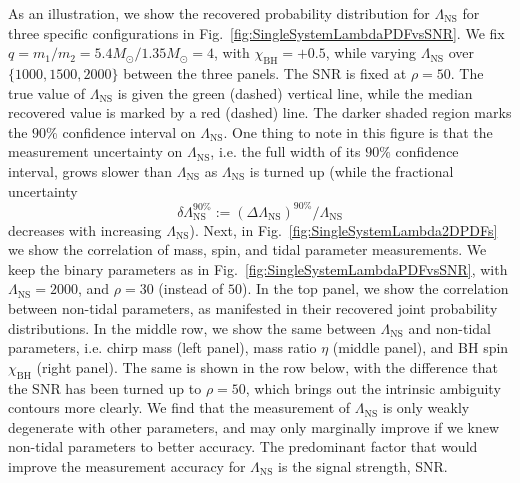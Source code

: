 \documentclass[aps,prd,amsmath,floats,floatfix, twocolumn,
superscriptaddress,nofootinbib,showpacs]{revtex4-1}
\newcommand{\lambdans}{\Lambda_\mathrm{NS}}
\newcommand{\chibh}{\chi_\mathrm{BH}}
\begin{document}
As an illustration, we show the recovered
probability distribution for $\lambdans$ for three specific configurations in 
Fig.~\ref{fig:SingleSystemLambdaPDFvsSNR}. We fix $q = m_1/m_2 =
5.4M_\odot/1.35M_\odot = 4$, with $\chibh=+0.5$, while varying $\lambdans$
over $\{1000, 1500, 2000\}$ between the three panels. The SNR is fixed at $\rho=50$.
The true value of $\lambdans$ is given the green (dashed) vertical line,
while the median recovered value is marked by a red (dashed) line. The darker
shaded region marks the $90\%$ confidence interval on $\lambdans$. One thing
to note in this figure is that the measurement uncertainty on $\lambdans$, i.e.
the full width of its $90\%$ confidence interval, grows slower than $\lambdans$
as $\lambdans$ is turned up (while the fractional uncertainty
\begin{equation}
\delta\lambdans^{90\%}:= (\Delta\lambdans)^{90\%}/\lambdans
\end{equation}
decreases with increasing $\lambdans$).
%
Next, in Fig.~\ref{fig:SingleSystemLambda2DPDFs} we show the correlation of
mass, spin, and tidal parameter measurements. We keep the binary parameters
as in Fig.~\ref{fig:SingleSystemLambdaPDFvsSNR}, with $\lambdans=2000$, and
$\rho=30$ (instead of $50$). In the top panel, we show the correlation between
non-tidal parameters, as manifested in their recovered joint probability
distributions.
In the middle row, we show the same between $\lambdans$ and non-tidal 
parameters, i.e. chirp mass (left panel), mass ratio $\eta$ (middle panel), and
BH spin $\chibh$ (right panel). The same is shown in the row below, with the
difference that the SNR has been turned up to $\rho=50$, which brings out the
intrinsic ambiguity contours more clearly.
%
We find that the measurement of $\lambdans$ is only weakly degenerate with
other parameters, and may only marginally improve if we knew non-tidal parameters
to better accuracy. The predominant factor that would improve the measurement
accuracy for $\lambdans$ is the signal strength, SNR.
\end{document}
